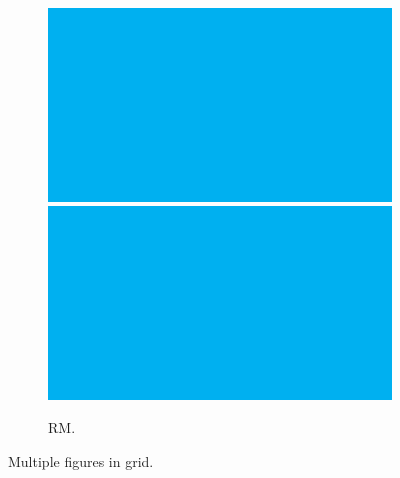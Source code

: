 \begin{figure}[h!]
\begin{subfigure}[b]{0.24\columnwidth}
  \end{subfigure}
  \begin{subfigure}[b]{0.24\columnwidth}
    \centering
    \includegraphics[width=1\textwidth]{fig/fig1.pdf}\\
    \includegraphics[width=1\textwidth]{fig/fig1.pdf}
    \caption{RM.}
    \label{fig:grid-right-most}
  \end{subfigure}
  \caption{Multiple figures in grid.}
  \label{fig:grid}
\end{figure}
